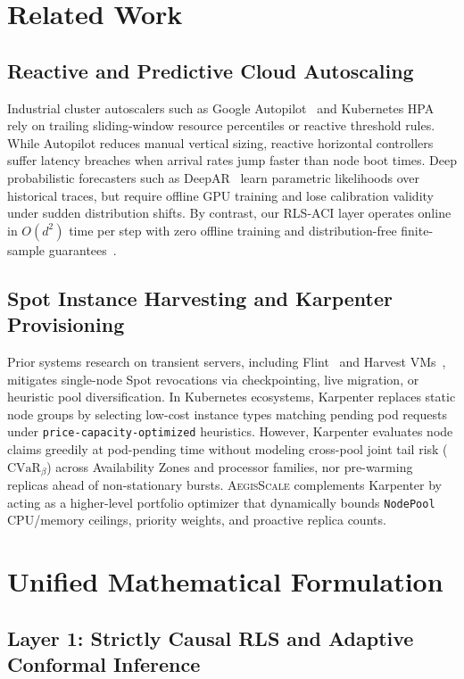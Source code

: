 \documentclass[journal]{IEEEtran}
\begin{document}
\section{Related Work}

\subsection{Reactive and Predictive Cloud Autoscaling}
Industrial cluster autoscalers such as Google Autopilot~\cite{rzadca2020autopilot} and Kubernetes HPA rely on trailing sliding-window resource percentiles or reactive threshold rules. While Autopilot reduces manual vertical sizing, reactive horizontal controllers suffer latency breaches when arrival rates jump faster than node boot times. Deep probabilistic forecasters such as DeepAR~\cite{salinas2020deepar} learn parametric likelihoods over historical traces, but require offline GPU training and lose calibration validity under sudden distribution shifts. By contrast, our RLS-ACI layer operates online in $O(d^2)$ time per step with zero offline training and distribution-free finite-sample guarantees~\cite{gibbs2021adaptive}.

\subsection{Spot Instance Harvesting and Karpenter Provisioning}
Prior systems research on transient servers, including Flint~\cite{sharma2016flint} and Harvest VMs~\cite{ambati2020providing}, mitigates single-node Spot revocations via checkpointing, live migration, or heuristic pool diversification. In Kubernetes ecosystems, Karpenter replaces static node groups by selecting low-cost instance types matching pending pod requests under \texttt{price-capacity-optimized} heuristics. However, Karpenter evaluates node claims greedily at pod-pending time without modeling cross-pool joint tail risk ($\mathrm{CVaR}_\beta$) across Availability Zones and processor families, nor pre-warming replicas ahead of non-stationary bursts. \textsc{AegisScale} complements Karpenter by acting as a higher-level portfolio optimizer that dynamically bounds \texttt{NodePool} CPU/memory ceilings, priority weights, and proactive replica counts.

\section{Unified Mathematical Formulation}

\subsection{Layer 1: Strictly Causal RLS and Adaptive Conformal Inference}
\end{document}
